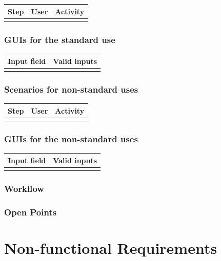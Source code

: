 \documentclass[12pt]{article}
\theoremstyle{definition}
\begin{document}
\begin{tabular}{|l|l|l|}
\hline
Step & User & Activity \\ \hline
 & & \\ \hline
\end{tabular}

\subsubsection{GUIs for the standard use}

\begin{tabular}{|l|l|}
\hline
Input field & Valid inputs \\ \hline
 &  \\ \hline
\end{tabular}

\subsubsection{Scenarios for non-standard uses}

\begin{tabular}{|l|l|l|}
\hline
Step & User & Activity \\ \hline
 & & \\ \hline
\end{tabular}

\subsubsection{GUIs for the non-standard uses}

\begin{tabular}{|l|l|}
\hline
Input field & Valid inputs \\ \hline
 &  \\ \hline
\end{tabular}

\subsubsection{Workflow}

\subsubsection{Open Points}

\pagebreak

\section{Non-functional Requirements}
\end{document}
